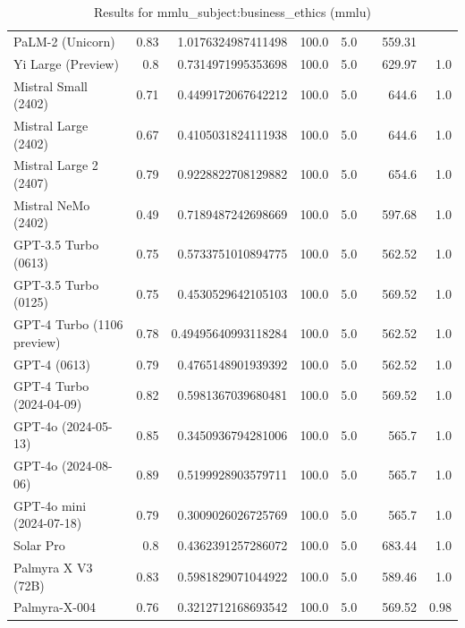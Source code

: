 \begin{table}[htp]
{\begin{tabular}{lrrrrrrr}
PaLM-2 (Unicorn) & 0.83 & 1.0176324987411498 & 100.0 & 5.0 &  & 559.31 &  \\
Yi Large (Preview) & 0.8 & 0.7314971995353698 & 100.0 & 5.0 &  & 629.97 & 1.0 \\
Mistral Small (2402) & 0.71 & 0.4499172067642212 & 100.0 & 5.0 &  & 644.6 & 1.0 \\
Mistral Large (2402) & 0.67 & 0.4105031824111938 & 100.0 & 5.0 &  & 644.6 & 1.0 \\
Mistral Large 2 (2407) & 0.79 & 0.9228822708129882 & 100.0 & 5.0 &  & 654.6 & 1.0 \\
Mistral NeMo (2402) & 0.49 & 0.7189487242698669 & 100.0 & 5.0 &  & 597.68 & 1.0 \\
GPT-3.5 Turbo (0613) & 0.75 & 0.5733751010894775 & 100.0 & 5.0 &  & 562.52 & 1.0 \\
GPT-3.5 Turbo (0125) & 0.75 & 0.4530529642105103 & 100.0 & 5.0 &  & 569.52 & 1.0 \\
GPT-4 Turbo (1106 preview) & 0.78 & 0.49495640993118284 & 100.0 & 5.0 &  & 562.52 & 1.0 \\
GPT-4 (0613) & 0.79 & 0.4765148901939392 & 100.0 & 5.0 &  & 562.52 & 1.0 \\
GPT-4 Turbo (2024-04-09) & 0.82 & 0.5981367039680481 & 100.0 & 5.0 &  & 569.52 & 1.0 \\
GPT-4o (2024-05-13) & 0.85 & 0.3450936794281006 & 100.0 & 5.0 &  & 565.7 & 1.0 \\
GPT-4o (2024-08-06) & 0.89 & 0.5199928903579711 & 100.0 & 5.0 &  & 565.7 & 1.0 \\
GPT-4o mini (2024-07-18) & 0.79 & 0.3009026026725769 & 100.0 & 5.0 &  & 565.7 & 1.0 \\
Solar Pro & 0.8 & 0.4362391257286072 & 100.0 & 5.0 &  & 683.44 & 1.0 \\
Palmyra X V3 (72B) & 0.83 & 0.5981829071044922 & 100.0 & 5.0 &  & 589.46 & 1.0 \\
Palmyra-X-004 & 0.76 & 0.3212712168693542 & 100.0 & 5.0 &  & 569.52 & 0.98 \\
\bottomrule
\end{tabular}}
\caption{Results for mmlu_subject:business_ethics (mmlu)}
\label{fig:mmlu_subject:business_ethics (mmlu)}
\end{table}